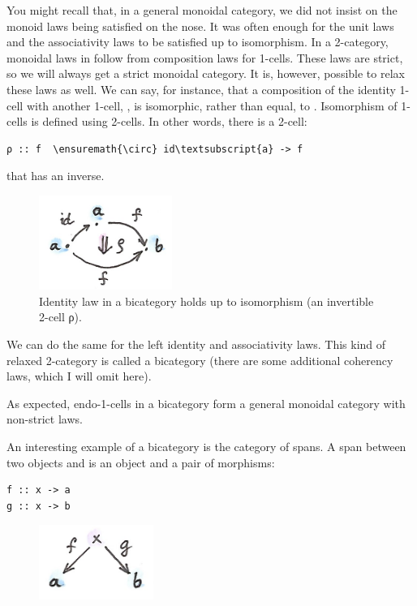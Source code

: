 You might recall that, in a general monoidal category, we did not insist
on the monoid laws being satisfied on the nose. It was often enough for
the unit laws and the associativity laws to be satisfied up to
isomorphism. In a 2-category, monoidal laws in  follow
from composition laws for 1-cells. These laws are strict, so we will
always get a strict monoidal category. It is, however, possible to relax
these laws as well. We can say, for instance, that a composition of the
identity 1-cell  with another 1-cell,
, is isomorphic, rather than equal,
to . Isomorphism of 1-cells is defined using 2-cells. In other
words, there is a 2-cell:

\begin{Verbatim}[commandchars=\\\{\}]
ρ :: f  \ensuremath{\circ} id\textsubscript{a} -> f
\end{Verbatim}
that has an inverse.

\begin{figure}[H]
\centering
\includegraphics[width=1.70833in]{images/bicat.png}
\caption{Identity law in a bicategory holds up to isomorphism (an invertible
2-cell ρ).}
\end{figure}

\noindent
We can do the same for the left identity and associativity laws. This
kind of relaxed 2-category is called a bicategory (there are some
additional coherency laws, which I will omit here).

As expected, endo-1-cells in a bicategory form a general monoidal
category with non-strict laws.

An interesting example of a bicategory is the category of spans. A span
between two objects  and  is an object 
and a pair of morphisms:

\begin{Verbatim}[commandchars=\\\{\}]
f :: x -> a
g :: x -> b
\end{Verbatim}

\begin{figure}[H]
\centering
\includegraphics[width=1.46875in]{images/span.png}
\end{figure}

